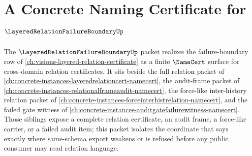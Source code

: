 \chapter{A Concrete Naming Certificate for $\LayeredRelationFailureBoundaryUp$}
\label{ch:concrete-instances-layered-relation-failure-boundary-namecert}

The $\LayeredRelationFailureBoundaryUp$ packet realizes the failure-boundary row of \autoref{ch:visions-layered-relation-certificate} as a finite $\NameCert$ surface for cross-domain relation certificates. It sits beside the full relation packet of \autoref{ch:concrete-instances-layeredrelationcert-namecert}, the audit-frame packet of \autoref{ch:concrete-instances-relationalframeaudit-namecert}, the force-like inter-history relation packet of \autoref{ch:concrete-instances-forceinterhistrelation-namecert}, and the failed gate witness of \autoref{ch:concrete-instances-auditgatefailurewitness-namecert}. Those siblings expose a complete relation certificate, an audit frame, a force-like carrier, or a failed audit item; this packet isolates the coordinate that says exactly where same-schema export weakens or is refused before any public consumer may read relation language.



